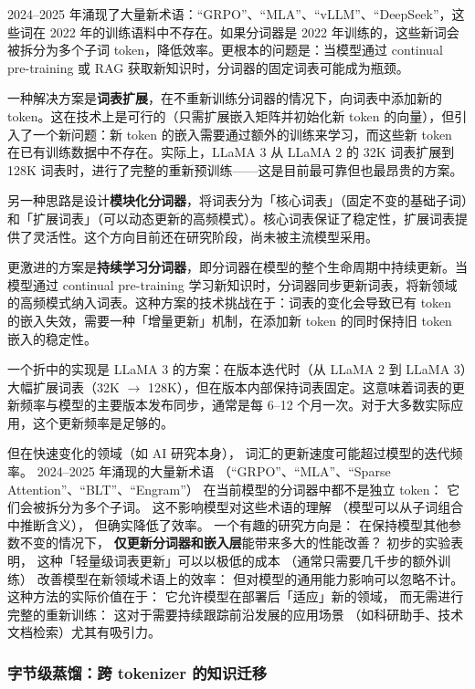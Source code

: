 2024--2025 年涌现了大量新术语：“GRPO”、“MLA”、“vLLM”、“DeepSeek”，这些词在 2022 年的训练语料中不存在。如果分词器是 2022 年训练的，这些新词会被拆分为多个子词 token，降低效率。更根本的问题是：当模型通过 continual pre-training 或 RAG 获取新知识时，分词器的固定词表可能成为瓶颈。

一种解决方案是\textbf{词表扩展}，在不重新训练分词器的情况下，向词表中添加新的 token。这在技术上是可行的（只需扩展嵌入矩阵并初始化新 token 的向量），但引入了一个新问题：新 token 的嵌入需要通过额外的训练来学习，而这些新 token 在已有训练数据中不存在。实际上，LLaMA 3 从 LLaMA 2 的 32K 词表扩展到 128K 词表时，进行了完整的重新预训练——这是目前最可靠但也最昂贵的方案。

另一种思路是设计\textbf{模块化分词器}，将词表分为「核心词表」（固定不变的基础子词）和「扩展词表」（可以动态更新的高频模式）。核心词表保证了稳定性，扩展词表提供了灵活性。这个方向目前还在研究阶段，尚未被主流模型采用。

更激进的方案是\textbf{持续学习分词器}，即分词器在模型的整个生命周期中持续更新。当模型通过 continual pre-training 学习新知识时，分词器同步更新词表，将新领域的高频模式纳入词表。这种方案的技术挑战在于：词表的变化会导致已有 token 的嵌入失效，需要一种「增量更新」机制，在添加新 token 的同时保持旧 token 嵌入的稳定性。

一个折中的实现是 LLaMA 3 的方案：在版本迭代时（从 LLaMA 2 到 LLaMA 3）大幅扩展词表（32K $\to$ 128K），但在版本内部保持词表固定。这意味着词表的更新频率与模型的主要版本发布同步，通常是每 6--12 个月一次。对于大多数实际应用，这个更新频率是足够的。

但在快速变化的领域（如 AI 研究本身），
词汇的更新速度可能超过模型的迭代频率。
2024--2025 年涌现的大量新术语
（“GRPO”、“MLA”、“Sparse Attention”、“BLT”、“Engram”）
在当前模型的分词器中都不是独立 token：
它们会被拆分为多个子词。
这不影响模型对这些术语的理解
（模型可以从子词组合中推断含义），
但确实降低了效率。
一个有趣的研究方向是：
在保持模型其他参数不变的情况下，
\textbf{仅更新分词器和嵌入层}能带来多大的性能改善？
初步的实验表明，
这种「轻量级词表更新」可以以极低的成本
（通常只需要几千步的额外训练）
改善模型在新领域术语上的效率：
但对模型的通用能力影响可以忽略不计。
这种方法的实际价值在于：
它允许模型在部署后「适应」新的领域，
而无需进行完整的重新训练：
这对于需要持续跟踪前沿发展的应用场景
（如科研助手、技术文档检索）尤其有吸引力。

\subsubsection{字节级蒸馏：跨 tokenizer 的知识迁移}

